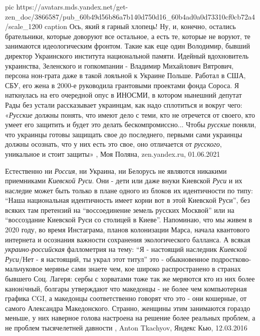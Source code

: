 \ifcmt
  pic https://avatars.mds.yandex.net/get-zen_doc/3866587/pub_60b49d56b86a7b140d750d16_60b4ad0a0d73310cf0cb72a4/scale_1200
	caption Ось, який я гарный хлопець!
\fi
Ну, и, конечно, остались брательники, которые доворуют все остальное, а есть
те, которые не воруют, те занимаются идеологическим фронтом. Такие как еще один
Володимир, бывший директор Украинского института национальной памяти. Идейный
вдохновитель украинства, Зеленского и гопкомпании - Владимир Михайлович
Вятрович, персона нон-грата даже в такой лояльной к Украине Польше. Работал в
США, СБУ, его жена в 2000-е руководила грантовыми проектами фонда Сороса. Я
наткнулась на его очередной опус в ИНОСМИ, в котором нынешний депутат Рады без
устали рассказывает украинцам, как надо сплотиться и вокруг чего: «\emph{Русские}
должны понять, что имеют дело с теми, кто не отречется от своего, кто умеет его
защитить и будет это делать бескомпромиссно... Чтобы \emph{русские} поняли, что украинцы
готовы защищать свое до последнего, первыми сами украинцы должны осознать, что
у них есть это свое, оно отличается от \emph{русского}, уникальное и стоит защиты»
, Моя Поляна, zen.yandex.ru, 01.06.2021

Естественно ни \emph{Россия}, ни Украина, ни Белорусь не являются никакими
приемниками \emph{Киевской Руси}. Они - дети или даже внуки Киевской
\emph{Руси} и их наследие может быть только в плане одного из блоков их
идентичности по типу: \enquote{Наша национальная идентичность имеет корни вот в
этой Киевской Руси}, без всяких там претензий на \enquote{воссоединение земель
русских Москвой} или на \enquote{воссоздание Киевской Руси со столицей в
Киеве}. Напоминаю, что мы живем в 2020 году, во время Инстаграма, планов
колонизации Марса, начала квантового интернета и осознания важности сохранения
экологического балланса. А всякая \emph{украино-российская} фаллометрия на
тему: \enquote{Я - настоящий наследник \emph{Киевской Руси}/Нет - я настоящий,
ты украл этот титул} это - обыкновенное подростково-мальчуковое мерянье сами
знаете чем, кое широко распространено в странах бывшего Соц. Лагеря: сербы с
хорватами тоже так же меряются кто из них более канонiчный, болгары утверждают
что македонцы - не более чем компьютерная графика CGI, а македонцы
соответственно говорят что это - они кошерные, от самого Александра
Македонского.  Странно, женщины этим занимаются гораздо меньше, у них наверное
голова настроена на решение более реальных проблем, а не проблем тысячелетней
давности
,
Anton Tkachyov, Яндекс Кью, 12.03.2016

